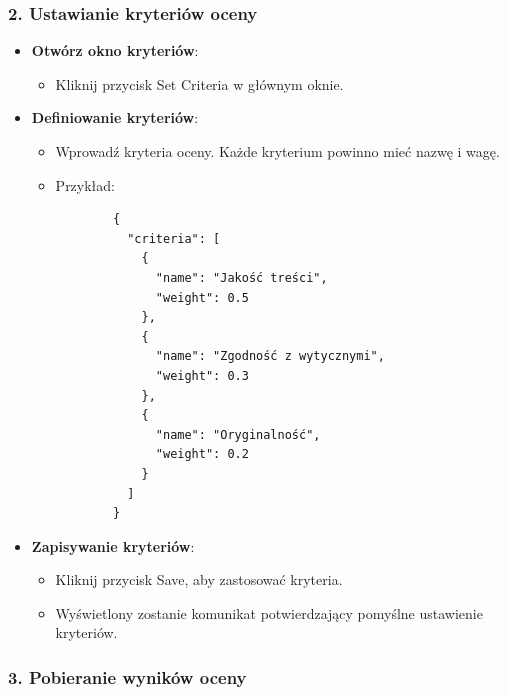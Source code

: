 \documentclass[a4paper, 12pt]{article}
\begin{document}
\subsubsection*{2. Ustawianie kryteriów oceny}

\begin{itemize}
    \item \textbf{Otwórz okno kryteriów}:
    \begin{itemize}
        \item Kliknij przycisk Set Criteria w głównym oknie.
    \end{itemize}
    \item \textbf{Definiowanie kryteriów}:
    \begin{itemize}
        \item Wprowadź kryteria oceny. Każde kryterium powinno mieć nazwę i wagę.
        \item Przykład:
        \begin{verbatim}
        {
          "criteria": [
            {
              "name": "Jakość treści",
              "weight": 0.5
            },
            {
              "name": "Zgodność z wytycznymi",
              "weight": 0.3
            },
            {
              "name": "Oryginalność",
              "weight": 0.2
            }
          ]
        }
        \end{verbatim}
    \end{itemize}
    \item \textbf{Zapisywanie kryteriów}:
    \begin{itemize}
        \item Kliknij przycisk Save, aby zastosować kryteria.
        \item Wyświetlony zostanie komunikat potwierdzający pomyślne ustawienie kryteriów.
    \end{itemize}
\end{itemize}

\subsubsection*{3. Pobieranie wyników oceny}
\end{document}
